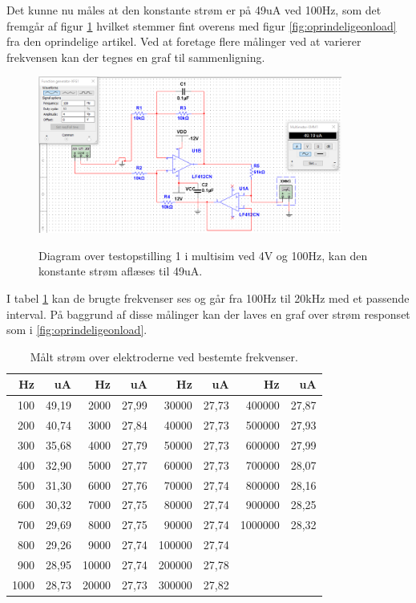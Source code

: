 Det kunne nu måles at den konstante strøm er på 49uA ved 100Hz, som det fremgår af figur \ref{fig:testopstilling1multisimnoload} hvilket stemmer fint overens med figur \ref{fig:oprindeligeonload} fra den oprindelige artikel. Ved at foretage flere målinger ved at varierer frekvensen kan der tegnes en graf til sammenligning.

\begin{figure}[H]
\centering
{\includegraphics[width=10cm]
{Figure/testopstilling1multisimnoload}}
\caption{Diagram over testopstilling 1 i multisim ved 4V og 100Hz, kan den konstante strøm aflæses til 49uA.}
\label{fig:testopstilling1multisimnoload}
\end{figure}

I tabel \ref{table:frekvensernoload} kan de brugte frekvenser ses og går fra 100Hz til 20kHz med et passende interval. På baggrund af disse målinger kan der laves en graf over strøm responset som i \ref{fig:oprindeligeonload}.

\begin{table}[H]
\centering
\begin{tabular}{| r | r || r | r || r | r || r | r |}
    \hline
    \textbf{Hz} & \textbf{uA} & \textbf{Hz} & \textbf{uA} & \textbf{Hz} & \textbf{uA} & \textbf{Hz} & \textbf{uA}\\ \hline
    100 & 49,19 & 2000 & 27,99 & 30000 & 27,73 & 400000 & 27,87  \\ \hline
    200 & 40,74 & 3000 & 27,84 & 40000 & 27,73 & 500000 & 27,93  \\ \hline
    300 & 35,68 & 4000 & 27,79 & 50000 & 27,73 & 600000 & 27,99  \\ \hline
    400 & 32,90 & 5000 & 27,77 & 60000 & 27,73 & 700000 & 28,07  \\ \hline
    500 & 31,30 & 6000 & 27,76 & 70000 & 27,74 & 800000 & 28,16  \\ \hline
    600 & 30,32 & 7000 & 27,75 & 80000 & 27,74 & 900000 & 28,25  \\ \hline
    700 & 29,69 & 8000 & 27,75 & 90000 & 27,74 & 1000000 & 28,32  \\ \hline
    800 & 29,26 & 9000 & 27,74 & 100000 & 27,74 &  &   \\ \hline
    900 & 28,95 & 10000 & 27,74 & 200000 & 27,78 &  &   \\ \hline
    1000 & 28,73 & 20000 & 27,73 & 300000 & 27,82 &  &  \\ \hline
\end{tabular}
    \caption{Målt strøm over elektroderne ved bestemte frekvenser.}
    \label{table:frekvensernoload}
\end{table} 


